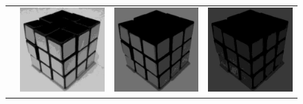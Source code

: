 \begin{figure}
\begin{tabular}{rccc}
         \raisebox{\raiselength}{Red} &
         \includegraphics[width=\rubiklength]{img/rubik/1_rgb_r.jpg} & 
         \includegraphics[width=\rubiklength]{img/rubik/2_rgb_r.jpg} & \includegraphics[width=\rubiklength]{img/rubik/3_rgb_r.jpg}\\
         

\end{tabular}
\end{figure}
